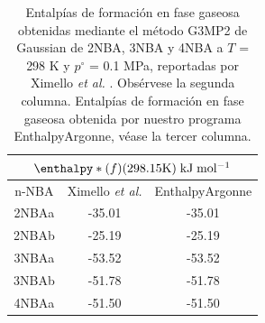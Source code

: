 \begin{table}[H]
\centering
\begin{tabular}{|c|c|c|}
\hline
	\multicolumn{3}{||c||}{$\enthalpy*(f){}(298.15 \mathrm{K})\; \mathrm{kJ\;mol^{-1}}$}\\
\hline
\hline
	n-NBA & Ximello \textit{et al.} \cite{Ximello2020} & EnthalpyArgonne\\ 
\hline
2NBAa & -35.01 & -35.01\\
\hline
2NBAb & -25.19 & -25.19\\ 
\hline 
3NBAa & -53.52 & -53.52\\
\hline
3NBAb & -51.78 & -51.78\\ 
\hline
4NBAa & -51.50 & -51.50\\ 
\hline  
\end{tabular} 
	\caption[Entalpías de formación en fase gaseosa obtenidas mediante el método G3MP2 de Gaussian de 2NBA, 3NBA y 4NBA a $T$ = 298 K y $p^{\circ}$ = 0.1 MPa, reportadas por Ximello \textit{et al.} \cite{Ximello2020}.]{Entalpías de formación en fase gaseosa obtenidas mediante el método G3MP2 de Gaussian de 2NBA, 3NBA y 4NBA a $T$ = 298 K y $p^{\circ}$ = 0.1 MPa, reportadas por Ximello \textit{et al.} \cite{Ximello2020}. Obsérvese la segunda columna. Entalpías de formación en fase gaseosa obtenida por nuestro programa EnthalpyArgonne, véase la tercer columna.}
\label{Ximello-table-3}
\end{table}

\newpage

